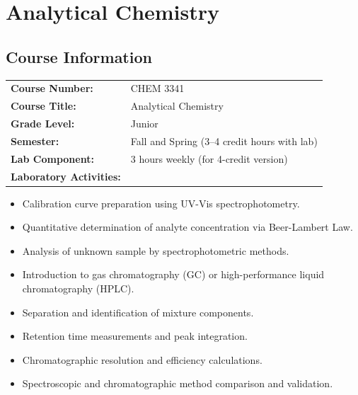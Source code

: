 \documentclass[12pt,oneside]{book}
\begin{document}



\chapter{Analytical Chemistry}

\section{Course Information}

\begin{tabular}{ll}
\textbf{Course Number:} & CHEM 3341 \\
\textbf{Course Title:} & Analytical Chemistry \\
\textbf{Grade Level:} & Junior \\
\textbf{Semester:} & Fall and Spring (3–4 credit hours with lab) \\
\textbf{Lab Component:} & 3 hours weekly (for 4-credit version) \\
\textbf{Laboratory Activities:}
\end{tabular}
\begin{itemize}
    \item Calibration curve preparation using UV-Vis spectrophotometry.
    \item Quantitative determination of analyte concentration via Beer-Lambert Law.
    \item Analysis of unknown sample by spectrophotometric methods.
    \item Introduction to gas chromatography (GC) or high-performance liquid chromatography (HPLC).
    \item Separation and identification of mixture components.
    \item Retention time measurements and peak integration.
    \item Chromatographic resolution and efficiency calculations.
    \item Spectroscopic and chromatographic method comparison and validation.
\end{itemize}
\end{document}
